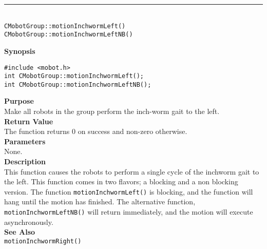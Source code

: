 \noindent
\vspace{5pt}
\rule{4.5in}{0.015in}\\
\noindent
{\LARGE \texttt{CMobotGroup::motionInchwormLeft()}}\\
{\LARGE \texttt{CMobotGroup::motionInchwormLeftNB()}}\\
{}

\noindent
{\bf Synopsis}
\vspace{-8pt}
\begin{verbatim}
#include <mobot.h>
int CMobotGroup::motionInchwormLeft();
int CMobotGroup::motionInchwormLeftNB();
\end{verbatim}

\noindent
{\bf Purpose}\\
Make all robots in the group perform the inch-worm gait to the left.\\

\noindent
{\bf Return Value}\\
The function returns 0 on success and non-zero otherwise.\\

\noindent
{\bf Parameters}\\
None.\\

\noindent
{\bf Description}\\
This function causes the robots to perform a single cycle of the inchworm gait
to the left. This function comes in two flavors; a blocking and a non blocking
version. The function \texttt{motionInchwormLeft()} is blocking, and the function
will hang until the motion has finished. The alternative function, \texttt{motionInchwormLeftNB()} 
will return immediately, and the motion will execute asynchronously. \\

\noindent
{\bf See Also}\\
\texttt{motionInchwormRight()}

